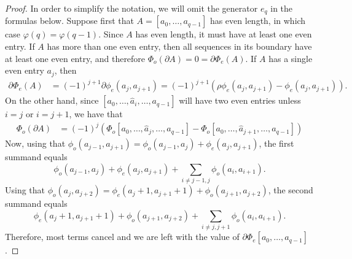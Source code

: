 \begin{proof} In order to simplify the notation, we will omit the generator $e_q$ in the formulas below.
	Suppose first that $A = [a_0,\dots,a_{q-1}]$ has even length, in which case $\varphi(q) = \varphi(q-1)$. Since $A$ has even length, it must have at least one even entry. If $A$ has more than one even entry, then all sequences in its boundary have at least one even entry, and therefore $\Phi_o(\partial A) = 0 = \partial\Phi_e(A)$. If $A$ has a single even entry $a_j$, then
	\begin{align*}
		\partial \Phi_e(A) &= (-1)^{j+1}\partial \phi_e(a_j,a_{j+1}) = (-1)^{j+1}\left(\rho\phi_e(a_j,a_{j+1}
		) - \phi_e(a_j,a_{j+1})\right).
	\end{align*}
	On the other hand, since $[a_0,\dots,\hat{a}_i,\dots,a_{q-1}]$ will have two even entries unless $i=j$ or $i=j+1$, we have that
	\begin{align*}
		\Phi_o(\partial A)
		&= (-1)^{j}\left(\Phi_o [a_0,\dots,\hat{a}_j,\dots,a_{q-1}]-\Phi_o [a_0,\dots,\hat{a}_{j+1},\dots,a_{q-1}]\right)
	\end{align*}
	Now, using that $\phi_o(a_{j-1},a_{j+1}) = \phi_o(a_{j-1},a_j) + \phi_e(a_j,a_{j+1})$, the first summand equals
	\[
	\phi_o(a_{j-1},a_j) + \phi_e(a_j,a_{j+1})+\sum_{i\neq j-1,j} \phi_o(a_i,a_{i+1}).
	\]
	Using that $\phi_o(a_{j},a_{j+2}) = \phi_e(a_j+1,a_{j+1}+1)+\phi_o(a_{j+1},a_{j+2})$, the second summand equals
	\[
	\phi_e(a_j+1,a_{j+1}+1) + \phi_o(a_{j+1},a_{j+2})+\sum_{i\neq j,j+1} \phi_o(a_i,a_{i+1}).
	\]
	Therefore, most terms cancel and we are left with the value of $\partial \Phi_e[a_0,\dots,a_{q-1}]$.


\end{proof}

